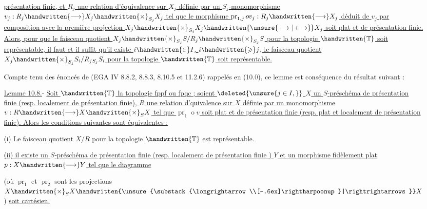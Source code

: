 \uline{présentation finie, et $R_j$ une relation d'équivalence sur $X_j$ définie par un $S_j$-monomorphisme $v_j:R_j\handwritten{\longrightarrow}X_j\handwritten{\times}_{S_j}X_j$ tel que le morphisme $\operatorname{pr}_{1,j}\mathbin{o} v_j:R_j\handwritten{\longrightarrow}X_j$ déduit de $v_j$ par composition avec la première projection $X_j\handwritten{\times}_{S_j}X_j\handwritten{\unsure{\longrightarrow|\longleftrightarrow}}X_j$ soit plat et de présentation finie. Alors, pour que le faisceau quotient $X_j\handwritten{\times}_{S_j}S/R_j\handwritten{\times}_{S_j}S$ pour la topologie $\handwritten{\mathbb{T}}$ soit représentable, il faut et il suffit qu'il existe $i\handwritten{\in}I$, $i\handwritten{\geqslant}j$, le faisceau quotient $X_j\handwritten{\times}_{S_j}S_i/R_j{}_{S_j}S_i$ pour la topologie $\handwritten{\mathbb{T}}$ soit représentable.}

Compte tenu des énoncés de (EGA IV 8.8.2, 8.8.3, 8.10.5 et 11.2.6) rappelés en (10.0), ce lemme est conséquence du résultat suivant :

\uline{Lemme 10.8.}- \uline{Soit $\handwritten{\mathbb{T}}$ la topologie fppf ou fpqc ; soient $\deleted{\unsure{j\in I,}}$ $X$ un $S$-préschéma de présentation finie (resp. localement de présentation finie), $R$ une relation d'quivalence sur $X$ définie par un monomorphisme $v:R\handwritten{\longrightarrow}X\handwritten{\times}_S X$ tel que $\operatorname{pr}_1\mathbin{o} v$ soit plat et de présentation finie (resp. plat et localement de présentation finie). Alors les conditions suivantes sont équivalentes :}

\uline{(i) Le faisceau quotient $X/R$ pour la topologie $\handwritten{\mathbb{T}}$ est représentable.}

\uline{(ii) il existe un $S$-préschéma de présentation finie (resp. localement de présentation finie ) $Y$ et un morphisme fidèlement plat $p:X\handwritten{\longrightarrow}Y$ tel que le diagramme}


(où $\operatorname{pr}_1$ et $\operatorname{pr}_2$ sont les projections $X\handwritten{\times}_S X\handwritten{\unsure{\substack{\longrightarrow\\[-.6ex]\rightharpoonup}|\rightrightarrows}}X$) \uline{soit cartésien.}

